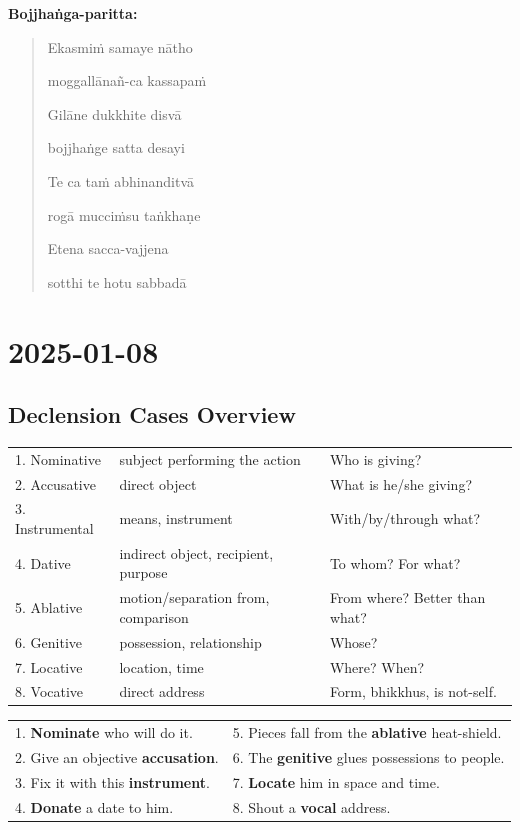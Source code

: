 \documentclass[11pt,oneside]{memoir}
\begin{document}
\textbf{Bojjhaṅga-paritta:}

\begin{quote}
Ekasmiṁ samaye nātho

moggallānañ-ca kassapaṁ

Gilāne dukkhite disvā

bojjhaṅge satta desayi

Te ca taṁ abhinanditvā

rogā mucciṁsu taṅkhaṇe

Etena sacca-vajjena

sotthi te hotu sabbadā
\end{quote}

\chapter{2025-01-08}
\label{sec:orgda2106e}
\section{Declension Cases Overview}
\label{sec:org42d1dd1}

\begin{tabular}{lll}
1. Nominative & subject performing the action & Who is giving?\\[0pt]
2. Accusative & direct object & What is he/she giving?\\[0pt]
3. Instrumental & means, instrument & With/by/through what?\\[0pt]
4. Dative & indirect object, recipient, purpose & To whom? For what?\\[0pt]
5. Ablative & motion/separation from, comparison & From where? Better than what?\\[0pt]
6. Genitive & possession, relationship & Whose?\\[0pt]
7. Locative & location, time & Where? When?\\[0pt]
8. Vocative & direct address & Form, bhikkhus, is not-self.\\[0pt]
\end{tabular}


\begin{center}
\begin{tabular}{ll}
1. \textbf{Nominate} who will do it. & 5. Pieces fall from the \textbf{ablative} heat-shield.\\[0pt]
2. Give an objective \textbf{accusation}. & 6. The \textbf{genitive} glues possessions to people.\\[0pt]
3. Fix it with this \textbf{instrument}. & 7. \textbf{Locate} him in space and time.\\[0pt]
4. \textbf{Donate} a date to him. & 8. Shout a \textbf{vocal} address.\\[0pt]
\end{tabular}
\end{center}
\end{document}
